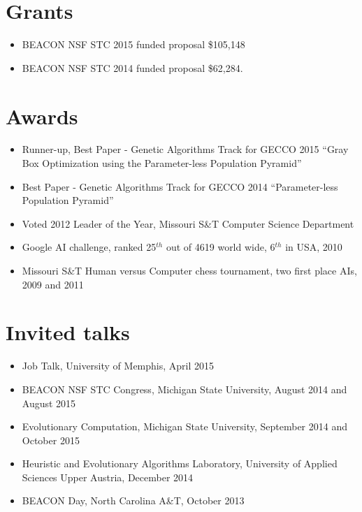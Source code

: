\documentclass[a4paper,11pt]{article}
\begin{document}
\begin{peer-publications}
\end{peer-publications}

\begin{other-publications}
\end{other-publications}

\section{Grants}
\begin{itemize}
\item BEACON NSF STC 2015 funded proposal \$105,148
\item BEACON NSF STC 2014 funded proposal \$62,284.
\end{itemize}

\section{Awards}
\begin{itemize}
\item     Runner-up, Best Paper - Genetic Algorithms Track for GECCO 2015 ``Gray Box Optimization using the Parameter-less Population Pyramid''
\item     Best Paper - Genetic Algorithms Track for GECCO 2014 ``Parameter-less Population Pyramid''
\item     Voted 2012 Leader of the Year, Missouri S\&T Computer Science Department
\item     Google AI challenge, ranked 25$^{th}$ out of 4619 world wide, 6$^{th}$ in USA, 2010
\item     Missouri S\&T Human versus Computer chess tournament, two first place AIs, 2009 and 2011
\end{itemize}

\section{Invited talks}
\begin{itemize}
\item Job Talk, University of Memphis, April 2015
\item BEACON NSF STC Congress, Michigan State University, August 2014 and August 2015
\item Evolutionary Computation, Michigan State University, September 2014 and October 2015
\item Heuristic and Evolutionary Algorithms Laboratory, University of Applied Sciences Upper Austria, December 2014
\item BEACON Day, North Carolina A\&T, October 2013
\end{itemize}
\end{document}
